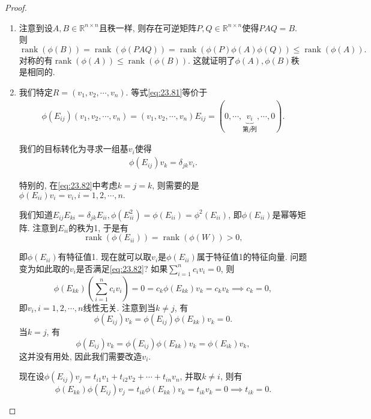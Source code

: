 \documentclass[../../main.tex]{subfiles}
\begin{document}
\begin{proof}
\begin{enumerate}[(1)]
\item 注意到设$A,B \in \mathbb{R}^{n \times n}$且秩一样, 则存在可逆矩阵$P,Q \in \mathbb{R}^{n \times n}$使得$PAQ = B$. 则
$\operatorname{rank}(\phi(B)) = \operatorname{rank}(\phi(PAQ)) = \operatorname{rank}(\phi(P)\phi(A)\phi(Q)) \leqslant \operatorname{rank}(\phi(A)).$
对称的有$\operatorname{rank}(\phi(A)) \leqslant \operatorname{rank}(\phi(B))$. 这就证明了$\phi(A),\phi(B)$秩是相同的.

\item 我们特定$R = (v_1,v_2,\cdots,v_n)$. 等式\eqref{eq:23.81}等价于
\begin{align*}
\phi (E_{ij})(v_1,v_2,\cdots ,v_n)=(v_1,v_2,\cdots ,v_n)E_{ij}=\left( 0,\cdots ,\underset{\text{第}j\text{列}}{\underbrace{v_i}},\cdots ,0 \right) .
\end{align*}

我们的目标转化为寻求一组基$v_i$使得
\begin{align}
\phi(E_{ij})v_k = \delta_{jk}v_i. \label{eq:23.82}
\end{align}

特别的, 在\eqref{eq:23.82}中考虑$k = j = k$, 则需要的是
$\phi(E_{ii})v_i = v_i, i = 1,2,\cdots,n.$

我们知道$E_{ij}E_{ki} = \delta_{jk}E_{ii}, \phi(E_{ii}^2) = \phi(E_{ii}) = \phi^2(E_{ii})$, 即$\phi(E_{ii})$是幂等矩阵. 注意到$E_{ii}$的秩为1, 于是有
$$\operatorname{rank}(\phi(E_{ii})) = \operatorname{rank}(\phi(W)) > 0,$$

即$\phi(E_{ii})$有特征值1. 现在就可以取$v_i$是$\phi(E_{ii})$属于特征值1的特征向量. 问题变为如此取的$v_i$是否满足\eqref{eq:23.82}?
如果$\sum_{i=1}^n c_i v_i = 0$, 则
$$\phi(E_{kk})\left(\sum_{i=1}^n c_i v_i\right) = 0 = c_k \phi(E_{kk})v_k = c_k v_k \implies c_k = 0,$$
即$v_i, i = 1,2,\cdots,n$线性无关.
注意到当$k \neq j$, 有
$$\phi(E_{ij})v_k = \phi(E_{ij})\phi(E_{kk})v_k = 0.$$
当$k = j$, 有
$$\phi(E_{ij})v_k = \phi(E_{ij})\phi(E_{kk})v_k = \phi(E_{ik})v_k,$$
这并没有用处, 因此我们需要改造$v_i$.

现在设$\phi(E_{ij})v_j = t_{i1}v_1 + t_{i2}v_2 + \cdots + t_{in}v_n$, 并取$k \neq i$, 则有
$$\phi(E_{kk})\phi(E_{ij})v_j = t_{ik}\phi(E_{kk})v_k = t_{ik}v_k = 0 \implies t_{ik} = 0.$$


\end{enumerate}
\end{proof}
\end{document}
